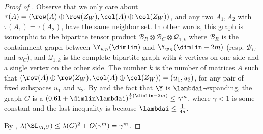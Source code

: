 \begin{proof}[Proof of ]
    Observe that we only care about \(\tau(A) = (\row(A) \oplus \row(Z_W),\col(A) \oplus \col(Z_W))\), and any two \(A_1,A_2\) with \(\tau(A_1) = \tau(A_2)\), have the same neighbor set. In other words, this graph is isomorphic to the bipartite tensor product \(\mathcal{B}_R \otimes \mathcal{B}_C \otimes \mathcal{Q}_{1,k}\) where \(\mathcal{B}_R\) is the containment graph between \(\Y_{w_R}(\dimlin)\) and \(\Y_{w_R}(\dimlin-2m)\) (resp. \(\mathcal{B}_C\) and \(w_C\)), and \(\mathcal{Q}_{1,k}\) is the complete bipartite graph with \(k\) vertices on one side and a single vertex on the other side. The number \(k\) is the number of matrices \(A\) such that  \((\row(A) \oplus \row(Z_W),\col(A) \oplus \col(Z_W)) = (u_1,u_2)\), for any pair of fixed subspaces \(u_1\) and \(u_2\). By  and the fact that \(\Y\) is \(\lambdai\)-expanding, the graph \(G\) is a \(\left ( 0.61 + \dimlin \lambdai\right )^{\frac{1}{2} (\dimlin-2m)}\leq \gamma^{m} \), where \(\gamma < 1\) is some constant and the last inequality is because \(\lambdai \leq \frac{1}{4d}\). %

    By , \(\lambda(\SL_{\Y,U}) \leq \lambda(G)^2 + O(\gamma^{ m}) = \gamma^{m}\).
\end{proof}


